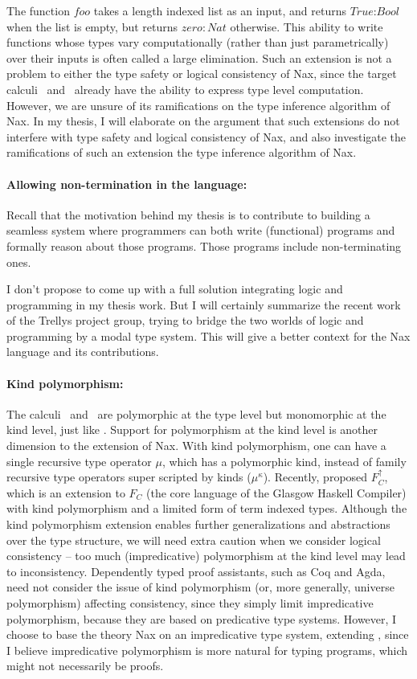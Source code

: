 The function $foo$ takes a length indexed list as an input, and returns
$\textit{True} : \textit{Bool}$ when the list is empty, but returns $zero
: \textit{Nat}$ otherwise.  This ability to write functions whose types
vary computationally (rather than just parametrically) over their inputs
is often called a large elimination. Such an extension is not a problem
to either the type safety or logical consistency of Nax, since the target
calculi \Fi\ and \Fixi\ already have the ability to express type level
computation. However, we are unsure of its ramifications on the type
inference algorithm of Nax. In my thesis, I will elaborate on the
argument that such extensions do not interfere with type safety and
logical consistency of Nax, and also investigate the ramifications 
of such an extension the type inference algorithm of Nax.

\paragraph{Allowing non-termination in the language:}
Recall that the motivation behind my thesis is to contribute to 
building a seamless system where programmers can both write
(functional) programs and formally reason about those programs.
Those programs include non-terminating ones.

I don't propose to come up with a full solution integrating logic and
programming in my thesis work. But I will certainly summarize the recent work
\cite{SjoCasAhnColEadFuKimSheStuWei12} of the Trellys project group, trying to
bridge the two worlds of logic and programming by a modal type system.
This will give a better context for the Nax language and its contributions.

\paragraph{Kind polymorphism:}
The calculi \Fi\ and \Fixi\ are polymorphic at the type level but monomorphic at
the kind level, just like \Fw. Support for polymorphism at the kind level is another
dimension to the extension of Nax. With kind polymorphism, one can
have a single recursive type operator $\mu$, which has a polymorphic kind, instead
of family recursive type operators super scripted by kinds ($\mu^\kappa$).
Recently, \citet{YorWeiCrePeyVytMag12} proposed $F_C^{\uparrow}$, which is
an extension to $F_C$ (the core language of the Glasgow Haskell Compiler)
with kind polymorphism and a limited form of term indexed types.
Although the kind polymorphism extension enables further generalizations and
abstractions over the type structure, we will need extra caution when we consider
logical consistency -- too much (impredicative) polymorphism at the kind level may
lead to inconsistency. Dependently typed proof assistants, such as Coq and Agda,
need not consider the issue of kind polymorphism (or, more generally,
universe polymorphism) affecting consistency, since they simply limit
impredicative polymorphism, because they are based on predicative type systems.
However, I choose to base the theory Nax on an impredicative type system,
extending \Fw, since I believe impredicative polymorphism is
more natural for typing programs, which might not necessarily be proofs.


